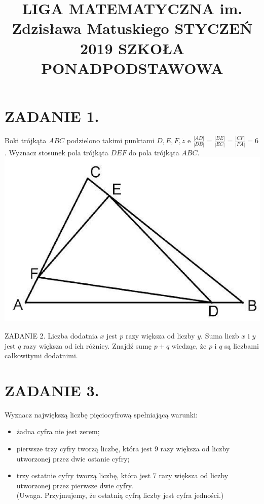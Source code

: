 \documentclass[10pt]{article}
\title{LIGA MATEMATYCZNA im. Zdzisława Matuskiego STYCZEŃ 2019 SZKOŁA PONADPODSTAWOWA }
\author{}
\date{}
\begin{document}
\maketitle
\section*{ZADANIE 1.}
Boki trójkąta \(A B C\) podzielono takimi punktami \(D, E, F, \dot{z}\) e \(\frac{|A D|}{|D B|}=\frac{|B E|}{|E C|}=\frac{|C F|}{|F A|}=6\). Wyznacz stosunek pola trójkąta \(D E F\) do pola trójkąta \(A B C\).\\
\includegraphics[max width=\textwidth, center]{2024_11_21_760b739d4da8f464884cg-1}

ZADANIE 2. Liczba dodatnia \(x\) jest \(p\) razy większa od liczby \(y\). Suma liczb \(x\) i \(y\) jest \(q\) razy większa od ich różnicy. Znajdź sumę \(p+q\) wiedząc, że \(p\) i \(q\) są liczbami całkowitymi dodatnimi.

\section*{ZADANIE 3.}
Wyznacz największą liczbę pięciocyfrową spełniającą warunki:

\begin{itemize}
  \item żadna cyfra nie jest zerem;
  \item pierwsze trzy cyfry tworzą liczbę, która jest 9 razy większa od liczby utworzonej przez dwie ostanie cyfry;
  \item trzy ostatnie cyfry tworzą liczbę, która jest 7 razy większa od liczby utworzonej przez pierwsze dwie cyfry.\\
(Uwaga. Przyjmujemy, że ostatnią cyfrą liczby jest cyfra jedności.)
\end{itemize}
\end{document}

